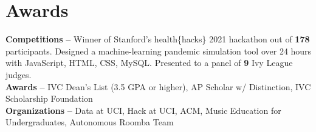 \documentclass[letterpaper,11pt]{article}
\begin{document}
\section{Awards}
\begin{itemize}[leftmargin=0.15in, label={}]
    \small{\item{
        \textbf{Competitions }{\textbf{--} Winner of Stanford's health\{hacks\} 2021 hackathon out of \textbf{178} participants. Designed a machine-learning pandemic simulation tool over 24 hours with JavaScript, HTML, CSS, MySQL. Presented to a panel of \textbf{9} Ivy League judges.}} \\
        \textbf{Awards }{\textbf{--} IVC Dean's List (3.5 GPA or higher), AP Scholar w/ Distinction, IVC Scholarship Foundation} \\
        \textbf{Organizations }{\textbf{--} Data at UCI, Hack at UCI, ACM, Music Education for Undergraduates, Autonomous Roomba Team} \\
    }
\end{itemize}


\end{document}
